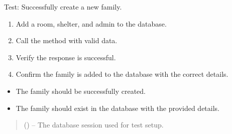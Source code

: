 \documentclass[letterpaper,10pt,english]{sphinxmanual}
\begin{document}
\begin{fulllineitems}
\label{\detokenize{test:test.test_family.test_create_family_success}}
\pysigstartsignatures
\pysiglinewithargsret
{}
{}
{}
\pysigstopsignatures
\sphinxAtStartPar
Test: Successfully create a new family.
\begin{description}
\begin{enumerate}
%
\item {} 
\sphinxAtStartPar
Add a room, shelter, and admin to the database.

\item {} 
\sphinxAtStartPar
Call the  method with valid data.

\item {} 
\sphinxAtStartPar
Verify the response is successful.

\item {} 
\sphinxAtStartPar
Confirm the family is added to the database with the correct details.

\end{enumerate}

\begin{itemize}
\item {} 
\sphinxAtStartPar
The family should be successfully created.

\item {} 
\sphinxAtStartPar
The family should exist in the database with the provided details.

\end{itemize}

\end{description}
\begin{quote}\begin{description}
\sphinxAtStartPar
{} () – The database session used for test setup.

\end{description}\end{quote}

\end{fulllineitems}

\end{document}
